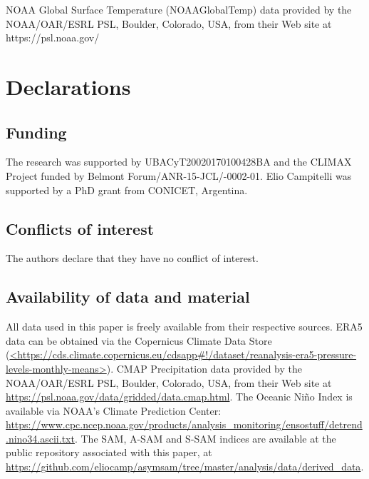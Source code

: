 \documentclass[smallextended]{svjour3}       %
\begin{document}
\begin{acknowledgements}
NOAA Global Surface Temperature (NOAAGlobalTemp) data provided by the NOAA/OAR/ESRL PSL, Boulder, Colorado, USA, from their Web site at https://psl.noaa.gov/ 
\end{acknowledgements}

\hypertarget{declarations}{%
\section*{Declarations}\label{declarations}}

\hypertarget{funding}{%
\subsection*{Funding}\label{funding}}

The research was supported by UBACyT20020170100428BA and the CLIMAX Project funded by Belmont Forum/ANR-15-JCL/-0002-01.
Elio Campitelli was supported by a PhD grant from CONICET, Argentina.

\hypertarget{conflicts-of-interest}{%
\subsection*{Conflicts of interest}\label{conflicts-of-interest}}

The authors declare that they have no conflict of interest.

\hypertarget{availability-of-data-and-material}{%
\subsection*{Availability of data and material}\label{availability-of-data-and-material}}

All data used in this paper is freely available from their respective sources.
ERA5 data can be obtained via the Copernicus Climate Data Store (\href{https://cds.climate.copernicus.eu/cdsapp\#!/dataset/reanalysis-era5-pressure-levels-monthly-means}{\textless https://cds.climate.copernicus.eu/cdsapp\#!/dataset/reanalysis-era5-pressure-levels-monthly-means\textgreater{}}).
CMAP Precipitation data provided by the NOAA/OAR/ESRL PSL, Boulder, Colorado, USA, from their Web site at \url{https://psl.noaa.gov/data/gridded/data.cmap.html}.
The Oceanic Niño Index is available via NOAA's Climate Prediction Center: \url{https://www.cpc.ncep.noaa.gov/products/analysis_monitoring/ensostuff/detrend.nino34.ascii.txt}.
The SAM, A\nobreakdash-SAM and S\nobreakdash-SAM indices are available at the public repository associated with this paper, at \url{https://github.com/eliocamp/asymsam/tree/master/analysis/data/derived_data}.
\end{document}
